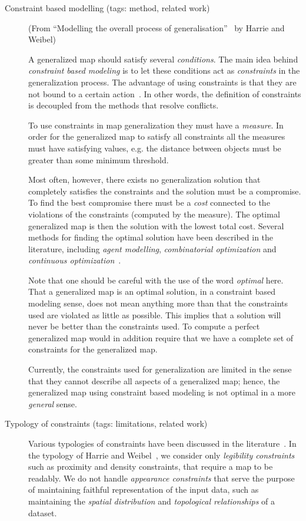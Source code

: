 \documentclass[11pt, oneside]{article}   	%
\begin{document}
\begin{description}
\item[Constraint based modelling (tags: method, related work)]  (From ``Modelling the overall process of generalisation''~\cite{harrie2007modelling} by Harrie and Weibel) 

A generalized map should satisfy several \emph{conditions}. The main idea behind \emph{constraint based modeling} is to let these conditions act as \emph{constraints} in the generalization process. The advantage of using constraints is that they are not bound to a certain action~\cite{beard1991constraints}. In other words, the definition of constraints is decoupled from the methods that resolve conflicts.

To use constraints in map generalization they must have a \emph{measure}. In order for the generalized map to satisfy all constraints all the measures must have satisfying values, e.g. the distance between objects must be greater than some minimum threshold. 

Most often, however, there exists no generalization solution that completely satisfies the constraints and the solution must be a compromise. To find the best compromise there must be a \emph{cost} connected to the violations of the constraints (computed by the measure). The optimal generalized map is then the solution with the lowest total cost. Several methods for finding the optimal solution have been described in the literature, including \emph{agent modelling}, \emph{combinatorial optimization} and \emph{continuous optimization}~\cite{harrie2007modelling}.

Note that one should be careful with the use of the word \emph{optimal} here. That a generalized map is an optimal solution, in a constraint based modeling sense, does not mean anything more than that the constraints used are violated as little as possible. This implies that a solution will never be better than the constraints used. To compute a perfect generalized map would in addition require that we have a complete set of constraints for the generalized map. 

Currently, the constraints used for generalization are limited in the sense that they cannot describe all aspects of a generalized map; hence, the generalized map using constraint based modeling is not optimal in a more \emph{general} sense.

\item[Typology of constraints (tags: limitations, related work)] Various typologies of constraints have been discussed in the literature~\cite{beard1991constraints,harrie2007modelling}. In the typology of Harrie and Weibel~\cite{harrie2007modelling}, we consider only \emph{legibility constraints} such as proximity and density constraints, that require a map to be readably. We do not handle \emph{appearance constraints} that serve the purpose of maintaining faithful representation of the input data, such as maintaining the \emph{spatial distribution} and \emph{topological relationships} of a dataset.


\end{description}
\end{document}
